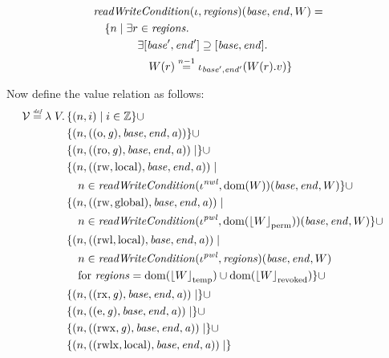 \documentclass{article}
\DeclarePairedDelimiter\floor{\lfloor}{\rfloor}
\newcommand{\defeq}{\stackrel{\textit{\tiny{def}}}{=}}
\newcommand{\nequal}[1][n]{\stackrel{\tiny{#1}}{=}}
\newcommand{\union}{\mathbin{\cup}}
\DeclareMathOperator{\dom}{dom}
\newcommand{\var}[1]{\mathit{#1}}
\newcommand{\gl}{\var{g}}
\newcommand{\addr}{\var{a}}
\newcommand{\start}{\var{base}}
\newcommand{\addrend}{\var{end}}
\newcommand{\perm}{\var{perm}}
\newcommand{\stdcap}[1][(\perm,\gl)]{\left(#1,\start,\addrend,\addr \right)}
\newcommand{\plainfun}[2]{
  \ifthenelse{\equal{#2}{}}
             {\mathit{#1}}
             {\mathit{#1}(#2)}
}
\newcommand{\writeCond}[1]{\plainfun{readWriteCondition}{#1}}
\newcommand{\erase}[2]{\floor*{#1}_{#2}}
\newcommand{\asmType}{\plaindom{AsmType}}
\newcommand{\plaindom}[1]{\mathrm{#1}}
\newcommand{\ints}{\mathbb{Z}}
\newcommand{\intr}[2]{\mathcal{#1}}
\newcommand{\valueintr}[1]{\intr{V}{#1}}
\newcommand{\stdvr}{\valueintr{\asmType}}
\newcommand{\npair}[2][n]{\left(#1,#2 \right)}
\newcommand{\plainperm}[1]{\mathrm{#1}}
\newcommand{\noperm}{\plainperm{o}}
\newcommand{\readonly}{\plainperm{ro}}
\newcommand{\readwrite}{\plainperm{rw}}
\newcommand{\exec}{\plainperm{rx}}
\newcommand{\entry}{\plainperm{e}}
\newcommand{\rwx}{\plainperm{rwx}}
\newcommand{\readwritel}{\plainperm{rwl}}
\newcommand{\rwlx}{\plainperm{rwlx}}
\newcommand{\local}{\plainperm{local}}
\newcommand{\glob}{\plainperm{global}}
\newcommand{\plainview}[1]{\mathrm{#1}}
\newcommand{\perma}{\plainview{perm}}
\newcommand{\temp}{\plainview{temp}}
\newcommand{\revoked}{\plainview{revoked}}
\begin{document}
\begin{align*}
    & \writeCond{}(\iota,\var{regions})(\start,\addrend,W) =  \\
    & \quad \begin{aligned}[t]
              \{ n \mid & \;\exists r \in \var{regions} \ldotp \\
              & \;\quad \exists [\start',\addrend'] \supseteq [\start,\addrend] \ldotp \\
              & \;\qquad W(r)\nequal[n-1] \iota_{\start',\addrend'}(W(r).v) \}
            \end{aligned}
\end{align*}

Now define the value relation as follows:
\begin{align*}
  \stdvr &\defeq \lambda \; V \ldotp 
           \begin{aligned}[t]
             & \{ \npair{i} \mid i \in \ints \} 
             \union \\
             & \{ \npair{\stdcap[(\noperm,\gl)] }  \} 
             \union \\
             & \{ \npair{\stdcap[(\readonly,\gl)] } \mid \} 
             \union \\
             & \{ \npair{\stdcap[(\readwrite,\local)] } \mid \\
             & \quad n \in \writeCond{}(\iota^{\var{nwl}},\dom(W))(\start,\addrend,W) \}
             \union \\
             & \{ \npair{\stdcap[(\readwrite,\glob)] } \mid  \\            
             & \quad n \in \writeCond{}(\iota^{\var{pwl}},\dom(\erase{W}{\perma}))(\start,\addrend,W) \}
             \union \\
             & \{ \npair{\stdcap[(\readwritel,\local)] } \mid \\
             & \quad n \in \writeCond{}(\iota^{\var{pwl}},\var{regions})(\start,\addrend,W) \\
             & \quad \text{for }\var{regions} = \dom(\erase{W}{\temp}) \union \dom(\erase{W}{\revoked})\}
             \union \\
             & \{ \npair{\stdcap[(\exec,\gl)]} \mid \}
             \union \\
             & \{ \npair{\stdcap[(\entry,\gl)]} \mid \} \union \\
             & \{ \npair{\stdcap[(\rwx,\gl)]} \mid \} \union \\
             & \{ \npair{\stdcap[(\rwlx,\local)]} \mid \}
           \end{aligned}
\end{align*}
\end{document}
